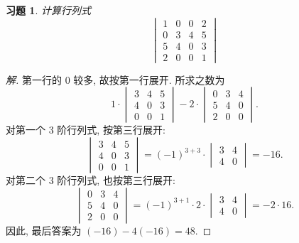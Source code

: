 \documentclass[UTF8]{ctexart}
\newtheorem{ex}[thm]{习题}
\begin{document}
\begin{ex}
  计算行列式
  \begin{equation*}
    \begin{vmatrix}
      1 & 0 & 0 & 2 \\
      0 & 3 & 4 & 5 \\
      5 & 4 & 0 & 3 \\
      2 & 0 & 0 & 1
    \end{vmatrix}
  \end{equation*}
\end{ex}

\begin{proof}[解]

  第一行的 $0$ 较多, 故按第一行展开.
  所求之数为
  \begin{equation*}
    1 \cdot
    \begin{vmatrix}
      3 & 4 & 5 \\
      4 & 0 & 3 \\
      0 & 0 & 1
    \end{vmatrix}
    - 2 \cdot
    \begin{vmatrix}
      0 & 3 & 4 \\
      5 & 4 & 0 \\
      2 & 0 & 0
    \end{vmatrix}.
  \end{equation*}
  对第一个 3 阶行列式, 按第三行展开:
  \begin{equation*}
    \begin{vmatrix}
      3 & 4 & 5 \\
      4 & 0 & 3 \\
      0 & 0 & 1
    \end{vmatrix}
    = (-1)^{3+3} \cdot
    \begin{vmatrix}
      3 & 4 \\ 4 & 0
    \end{vmatrix}
    = -16.
  \end{equation*}
  对第二个 3 阶行列式, 也按第三行展开:
  \begin{equation*}
    \begin{vmatrix}
      0 & 3 & 4 \\
      5 & 4 & 0 \\
      2 & 0 & 0
    \end{vmatrix}
    =(-1)^{3+1} \cdot 2 \cdot
    \begin{vmatrix}
      3 & 4 \\ 4 & 0
    \end{vmatrix} = - 2\cdot 16.
  \end{equation*}
  因此, 最后答案为 \((-16)-4(-16)=48\).
\end{proof}
\end{document}

